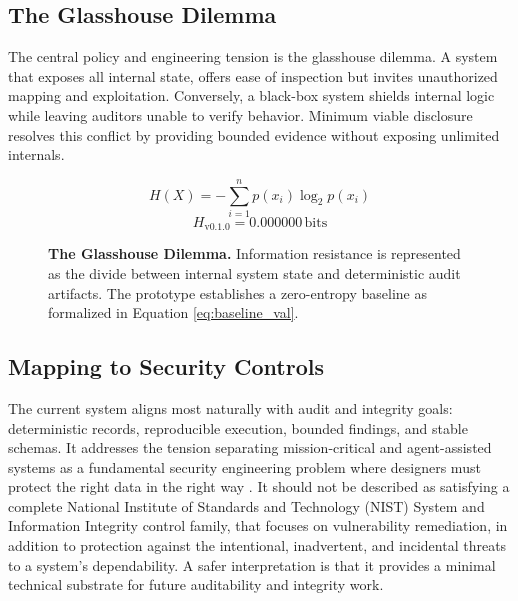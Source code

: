 \documentclass[11pt]{article}
\begin{document}
\subsection{The Glasshouse Dilemma}

The central policy and engineering tension is the glasshouse dilemma. A system that exposes all internal state, offers ease of inspection but invites unauthorized mapping and exploitation. Conversely, a black-box system shields internal logic while leaving auditors unable to verify behavior. Minimum viable disclosure resolves this conflict by providing bounded evidence without exposing unlimited internals.

\begin{figure}[htbp]
    \centering
    \vspace{1em}
    
    \begin{minipage}{0.8\linewidth}
        \centering
        \small
        \begin{equation}
            H(X) = -\sum_{i=1}^{n} p(x_i)\log_2 p(x_i)
        \end{equation}
        \begin{equation}
            H_{\mathrm{v0.1.0}} = 0.000000 \, \mathrm{bits} \label{eq:baseline_val}
        \end{equation}
    \end{minipage}
    
    \vspace{1em}
    
    \caption{\textbf{The Glasshouse Dilemma.} Information resistance is represented as the divide between internal system state and deterministic audit artifacts. The prototype establishes a zero-entropy baseline as formalized in Equation \ref{eq:baseline_val}.}
    \label{fig:glasshouse_dilemma}
\end{figure}

\subsection{Mapping to Security Controls}

The current system aligns most naturally with audit and integrity goals: deterministic records, reproducible execution, bounded findings, and stable schemas. It addresses the tension separating mission-critical and agent-assisted systems as a fundamental security engineering problem where designers must protect the right data in the right way \cite{anderson}. It should not be described as satisfying a complete National Institute of Standards and Technology (NIST) System and Information Integrity control family, that focuses on vulnerability remediation, in addition to protection against the intentional, inadvertent, and incidental threats to a system's dependability. A safer interpretation is that it provides a minimal technical substrate for future auditability and integrity work.
\end{document}
